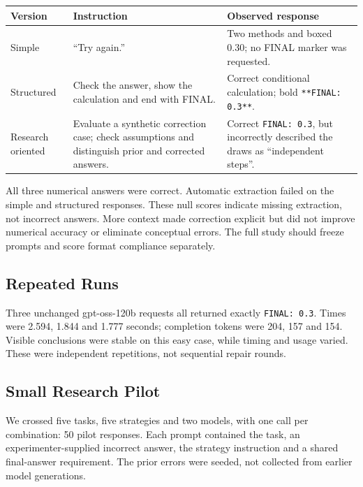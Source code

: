 \documentclass[11pt,letterpaper]{article}
\begin{document}
{\small
\renewcommand{\arraystretch}{1.20}
\begin{tabularx}{\linewidth}{Y{0.55}Y{1.15}Y{1.30}}
\toprule
{}
\textbf{Version} & \textbf{Instruction} & \textbf{Observed response} \\
\midrule
Simple & ``Try again.'' & Two methods and boxed 0.30; no FINAL marker was requested. \\
Structured & Check the answer, show the calculation and end with FINAL. & Correct conditional calculation; bold \texttt{**FINAL: 0.3**}. \\
Research oriented & Evaluate a synthetic correction case; check assumptions and distinguish prior and corrected answers. & Correct \texttt{FINAL: 0.3}, but incorrectly described the draws as ``independent steps''. \\
\bottomrule
\end{tabularx}}

All three numerical answers were correct. Automatic extraction failed on the simple and structured responses. These null scores indicate missing extraction, not incorrect answers. More context made correction explicit but did not improve numerical accuracy or eliminate conceptual errors. The full study should freeze prompts and score format compliance separately.

\subsection*{Repeated Runs}
Three unchanged gpt-oss-120b requests all returned exactly \texttt{FINAL: 0.3}. Times were 2.594, 1.844 and 1.777 seconds; completion tokens were 204, 157 and 154. Visible conclusions were stable on this easy case, while timing and usage varied. These were independent repetitions, not sequential repair rounds.

\subsection*{Small Research Pilot}
We crossed five tasks, five strategies and two models, with one call per combination: 50 pilot responses. Each prompt contained the task, an experimenter-supplied incorrect answer, the strategy instruction and a shared final-answer requirement. The prior errors were seeded, not collected from earlier model generations.
\end{document}
